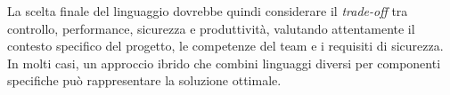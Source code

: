 La scelta finale del linguaggio dovrebbe quindi considerare il \textit{trade-off}
tra controllo, performance, sicurezza e produttività, valutando attentamente il
contesto specifico del progetto, le competenze del team e i requisiti di sicurezza.
In molti casi, un approccio ibrido che combini linguaggi diversi per componenti specifiche
può rappresentare la soluzione ottimale.